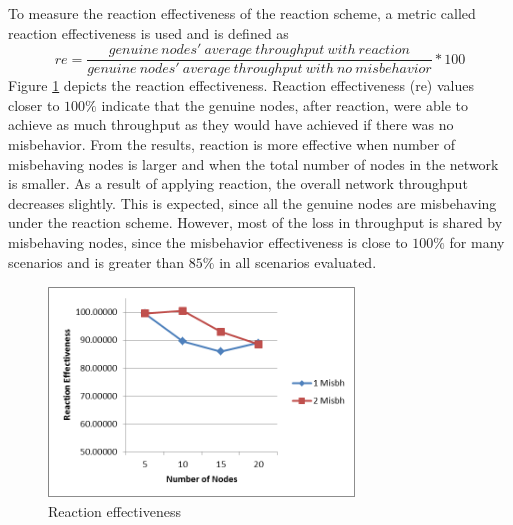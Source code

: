 \documentclass[12pt,letterpaper,english]{article}
\begin{document}
To measure the reaction effectiveness of the reaction scheme, a metric called reaction effectiveness is used and is defined as 
\begin{equation}
\label{equation:reaction_effectiveness}
re = \frac{genuine\ nodes'\ average\ throughput\ with\ reaction}{genuine\ nodes'\ average\ throughput\ with\ no\ misbehavior} * 100
\end{equation}
Figure \ref{figure:reaction_effectiveness} depicts the reaction effectiveness. 
Reaction effectiveness (re) values closer to $100\%$ indicate that the genuine nodes, after reaction, were able to achieve as much throughput as they would have achieved if there was no misbehavior. From the results, reaction is more effective when number of misbehaving nodes is larger and when the total number of nodes in the network is smaller. As a result of applying reaction, the overall network throughput decreases slightly. This is expected, since all the genuine nodes are misbehaving under the reaction scheme. However, most of the loss in throughput is shared by misbehaving nodes, since the misbehavior effectiveness is close to $100\%$ for many scenarios and is greater than $85\%$ in all scenarios evaluated.
\begin{figure}
\centering
\includegraphics[width=3.2in,height=2.2in]{figures/reaction_effectiveness.png}
\caption{Reaction effectiveness}
\label{figure:reaction_effectiveness}
\end{figure}
\end{document}
